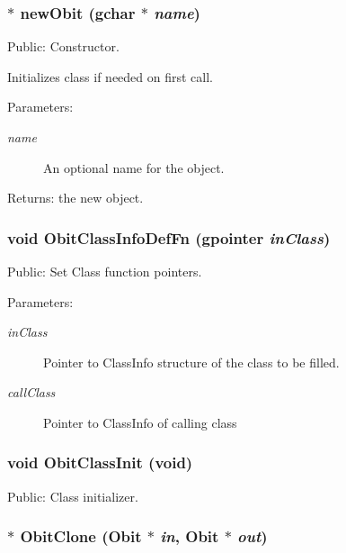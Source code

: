 \subsubsection{$\ast$ new\-Obit (gchar $\ast$ {\em name})}\label{Obit_8h_a13}


Public: Constructor. 

Initializes class if needed on first call. \begin{Desc}
\item[Parameters:]
\begin{description}
\item[{\em name}]An optional name for the object. \end{description}
\end{Desc}
\begin{Desc}
\item[Returns:]the new object. \end{Desc}
\subsubsection{\setlength{\rightskip}{0pt plus 5cm}void Obit\-Class\-Info\-Def\-Fn (gpointer {\em in\-Class})}\label{Obit_8h_a25}


Public: Set Class function pointers. 

\begin{Desc}
\item[Parameters:]
\begin{description}
\item[{\em in\-Class}]Pointer to Class\-Info structure of the class to be filled. \item[{\em call\-Class}]Pointer to Class\-Info of calling class \end{description}
\end{Desc}
\subsubsection{\setlength{\rightskip}{0pt plus 5cm}void Obit\-Class\-Init (void)}\label{Obit_8h_a14}


Public: Class initializer. 

\subsubsection{$\ast$ Obit\-Clone ({\bf Obit} $\ast$ {\em in}, {\bf Obit} $\ast$ {\em out})}\label{Obit_8h_a17}


